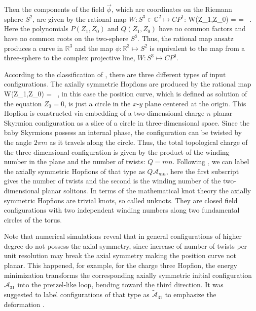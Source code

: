 \documentclass[12pt,a4paper]{article}
\begin{document}
Then the components
of the field $\vec\phi$, which are coordinates on the Riemann sphere $S^2$, are given by the rational map $W: S^3 \in \mathbb{C}^2 \mapsto CP^1$:
\be
W(Z_1,Z_0) =  =  \, .
\label{rational-Hopf-2}
\ee
Here the polynomials $P(Z_1,Z_0)$ and $Q(Z_1,Z_0)$  have no common factors and have
no common roots on the two-sphere $S^2$. Thus,
the rational map ansatz  produces a curve in $\mathbb{R}^3$ and
the map $\phi: \mathbb{R}^3 \mapsto S^2$ is equivalent to the map
from a three-sphere to
the complex projective line, $W:S^3 \mapsto CP^1$.

According to the classification of \cite{Sutcliffe:2007ui},
there are three different types of input configurations. The axially symmetric Hopfions are produced by the rational map
\be
W(Z_1,Z_0) = \, ,
\label{map-unknot}
\ee
in this case the position curve, which is defined as solution of the equation $Z_0=0$,  is just a circle
in the $x$-$y$ plane centered at the origin.
This Hopfion is constructed via embedding of
a two-dimensional charge $n$ planar Skyrmion configuration as a slice of a circle in
three-dimensional space. Since the baby Skyrmions possess an internal phase, the configuration can be twisted by the angle $2\pi m$ as
it travels along the circle. Thus,
the total topological charge of the three dimensional configuration is given by the product of the winding number in the
plane and the number of twists: $Q=mn$. Following \cite{Sutcliffe:2007ui}, we can label the axially symmetric Hopfions of that
type as $Q \mathcal{A}_{mn}$, here the first subscript gives the number of twists and the second
is the winding number of the two-dimensional planar solitons.
In terms of the mathematical knot theory the axially symmetric Hopfions are trivial knots,
so called unknots. They are closed field configurations with two independent winding numbers along two fundamental circles
of the torus.

Note that numerical simulations reveal that in general configurations of higher degree do not possess the axial symmetry, since
increase of number of twists per unit resolution may
break the axial symmetry making the position curve not planar. This happened, for example, for the
charge three Hopfion, the energy minimization transforms the corresponding
axially symmetric initial configuration $\mathcal{A}_{31}$ into
the pretzel-like loop, bending toward the third direction. It was suggested to label configurations of that type as
$\widetilde{\mathcal{A}}_{31}$ to emphasize the deformation \cite{Sutcliffe:2007ui}.
\end{document}
